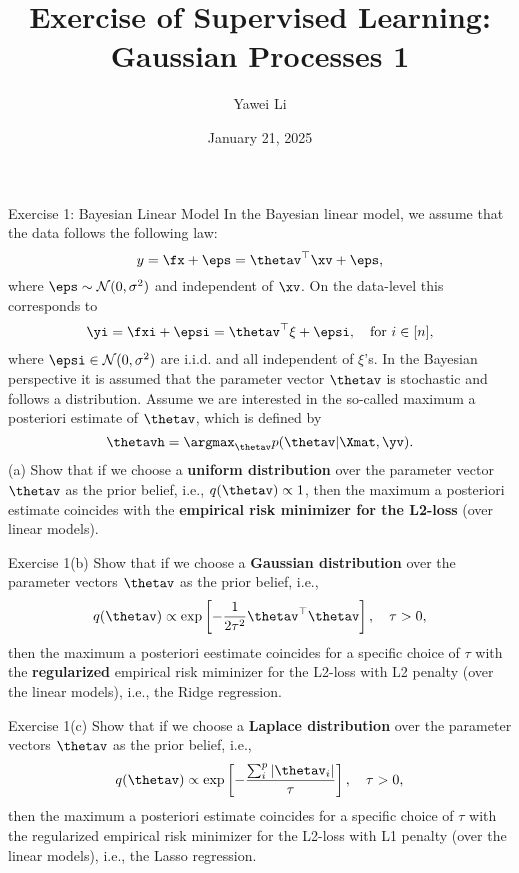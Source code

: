 \documentclass[aspectratio=169]{beamer}
\title[]{\textbf{Exercise of Supervised Learning:\\Gaussian Processes 1}}
\author{Yawei Li}
\institute[LMU]
{
\\
  \texttt{yawei.li@stat.uni-muenchen.de}
}
\date{January 21, 2025}
\newcommand{\Norm}{\mathcal{N}}
\newcommand{\sumip}{\sum_i^p}
\newcommand{\thetai}{\thetav_i}
\begin{document}
\begin{frame}
\titlepage

\end{frame}

\begin{frame}{Exercise 1: Bayesian Linear Model}
\small
In the Bayesian linear model, we assume that the data follows the following law:
\begin{equation*}
	y = \fx + \eps = \thetav^\top \xv + \eps,
\end{equation*}
where $\eps \sim \Norm(0, \sigma^2)$ and independent of $\xv$. On the data-level this corresponds to 
\begin{equation*}
	\yi = \fxi + \epsi = \thetav^\top \xi + \epsi, \quad \text{for } i \in [n],
\end{equation*}
where $\epsi \in \Norm(0, \sigma^2)$ are i.i.d. and all independent of $\xi$'s. In the Bayesian perspective it is assumed that the parameter vector $\thetav$ is stochastic and follows a distribution.
%
Assume we are interested in the so-called maximum a posteriori estimate of $\thetav$, which is defined by $$\thetavh = \argmax_{\thetav} p(\thetav | \Xmat, \yv).$$
%
(a) Show that if we choose a \textbf{uniform distribution} over the parameter vector $\thetav$ as the prior belief, i.e., $q(\thetav) \propto 1$, then the maximum a posteriori estimate coincides with the \textbf{empirical risk minimizer for the L2-loss} (over linear models). 	
\end{frame}

\begin{frame}{Exercise 1(b)}
	Show that if we choose a \textbf{Gaussian distribution} over the parameter vectors $\thetav$ as the prior belief, i.e., 
	\begin{equation*}
		q(\thetav) \propto \exp \left[ - \frac{1}{2 \tau^2} \thetav^\top \thetav \right], \quad \tau > 0,
	\end{equation*}
	then the maximum a posteriori eestimate coincides for a specific choice of $\tau$ with the \textbf{regularized} empirical risk miminizer for the L2-loss with L2 penalty (over the linear models), i.e., the Ridge regression.
\end{frame}

\begin{frame}{Exercise 1(c)}
	Show that if we choose a \textbf{Laplace distribution} over the parameter vectors $\thetav$ as the prior belief, i.e., 
	\begin{equation*}
		q(\thetav) \propto \exp \left[ - \frac{\sumip |\thetai|}{\tau} \right], \quad \tau > 0,
	\end{equation*}
	then the maximum a posteriori estimate coincides for a specific choice of $\tau$ with the regularized empirical risk minimizer for the L2-loss with L1 penalty (over the linear models), i.e., the Lasso regression.
\end{frame}
\end{document}
